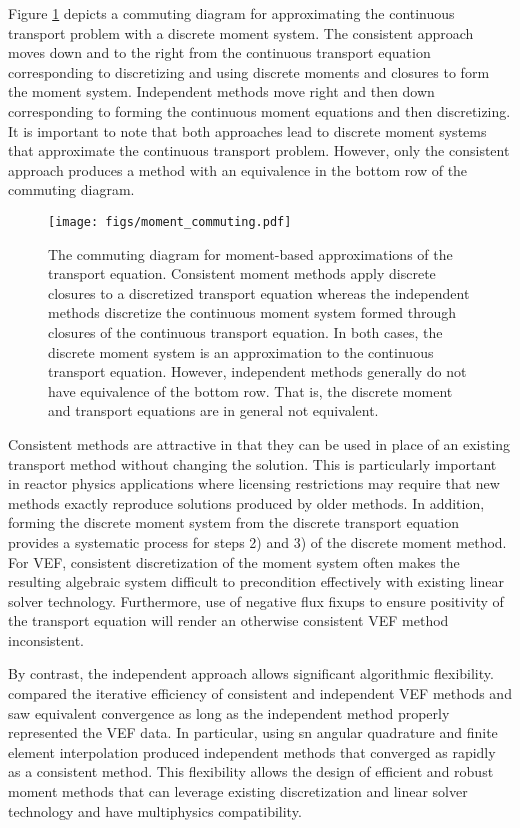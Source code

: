 \documentclass[../doc.tex]{subfiles}
\begin{document}
Figure \ref{moment:commuting} depicts a commuting diagram for approximating the continuous transport problem with a discrete moment system. The consistent approach moves down and to the right from the continuous transport equation corresponding to discretizing and using discrete moments and closures to form the moment system. Independent methods move right and then down corresponding to forming the continuous moment equations and then discretizing. It is important to note that both approaches lead to discrete moment systems that approximate the continuous transport problem. However, only the consistent approach produces a method with an equivalence in the bottom row of the commuting diagram.
\begin{figure}
\centering
\texttt{[image: figs/moment\_commuting.pdf]}
\caption{The commuting diagram for moment-based approximations of the transport equation. Consistent moment methods apply discrete closures to a discretized transport equation whereas the independent methods discretize the continuous moment system formed through closures of the continuous transport equation. In both cases, the discrete moment system is an approximation to the continuous transport equation. However, independent methods generally do not have equivalence of the bottom row. That is, the discrete moment and transport equations are in general not equivalent.}
\label{moment:commuting}
\end{figure}

Consistent methods are attractive in that they can be used in place of an existing transport method without changing the solution. This is particularly important in reactor physics applications where licensing restrictions may require that new methods exactly reproduce solutions produced by older methods. In addition, forming the discrete moment system from the discrete transport equation provides a systematic process for steps 2) and 3) of the discrete moment method. For VEF, consistent discretization of the moment system often makes the resulting algebraic system difficult to precondition effectively with existing linear solver technology. 
Furthermore, use of negative flux fixups to ensure positivity of the transport equation will render an otherwise consistent VEF method inconsistent. 

By contrast, the independent approach allows significant algorithmic flexibility. 
\textcite{two-level-independent-warsa} compared the iterative efficiency of consistent and independent VEF methods and saw equivalent convergence as long as the independent method properly represented the VEF data. In particular, using \gls{sn} angular quadrature and finite element interpolation produced independent methods that converged as rapidly as a consistent method. This flexibility allows the design of efficient and robust moment methods that can leverage existing discretization and linear solver technology and have multiphysics compatibility. 
\end{document}
